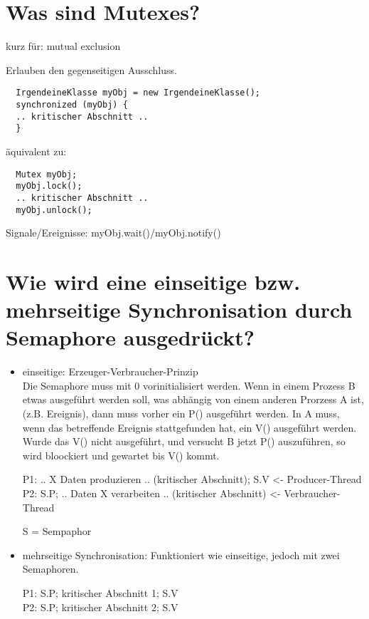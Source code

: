 \documentclass[12pt,a4paper,ngerman]{scrartcl}
\newcommand{\question}[1]{#1}
\newenvironment {answer}
                {}
                {}
\begin{document}
\section{\question{Was sind Mutexes?}}
\begin{answer}
kurz für: mutual exclusion

Erlauben den gegenseitigen Ausschluss.

\begin{verbatim}
  IrgendeineKlasse myObj = new IrgendeineKlasse();
  synchronized (myObj) {
  .. kritischer Abschnitt ..
  }
\end{verbatim}

äquivalent zu:

\begin{verbatim}
  Mutex myObj;
  myObj.lock();
  .. kritischer Abschnitt ..
  myObj.unlock();
\end{verbatim}

Signale/Ereignisse: myObj.wait()/myObj.notify()
\end{answer}



\section{\question{Wie wird eine einseitige bzw. mehrseitige Synchronisation durch Semaphore ausgedrückt?}}
\begin{answer}

\begin{itemize}

  \item einseitige: Erzeuger-Verbraucher-Prinzip \\
    Die Semaphore muss mit 0 vorinitialisiert werden. Wenn in einem Prozess B etwas ausgeführt werden soll, was abhängig von einem anderen Prorzess A ist, (z.B. Ereignis), dann muss vorher ein P() ausgeführt werden. In A muss, wenn das betreffende Ereignis stattgefunden hat, ein V() ausgeführt werden. Wurde das V() nicht ausgeführt, und versucht B jetzt P() auszuführen, so wird bloockiert und gewartet bis V() kommt.

    P1: .. X Daten produzieren .. (kritischer Abschnitt); S.V <- Producer-Thread \\
    P2: S.P; .. Daten X verarbeiten .. (kritischer Abschnitt) <- Verbraucher-Thread

    S = Sempaphor

  \item mehrseitige Synchronisation: Funktioniert wie einseitige, jedoch mit zwei Semaphoren.

      P1: S.P; kritischer Abschnitt 1; S.V \\
      P2: S.P; kritischer Abschnitt 2; S.V

\end{itemize}
\end{answer}
\end{document}

